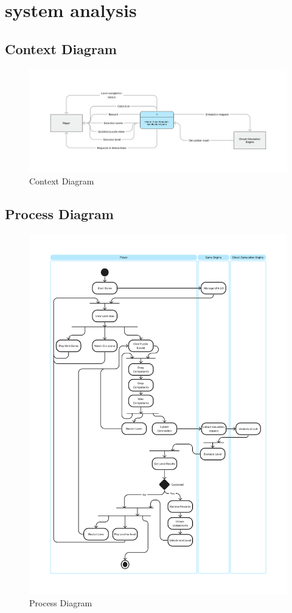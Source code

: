 \documentclass[../main.tex]{subfiles}
\begin{document}
\section{system analysis}

\subsection{Context Diagram}
\begin{figure}[ht]
\centering
\includegraphics[scale=0.3]{images/chapter3/Context.png}
\caption{Context Diagram}
\label{Context.png}
\end{figure}
\newpage
\subsection{Process Diagram}
\begin{figure}[ht!]
\centering
\includegraphics[scale=0.27]{images/chapter3/Process.png}
\caption{Process Diagram}
\label{prcess.png}
\end{figure}
\vfill
\newpage
\vfill
\end{document}

